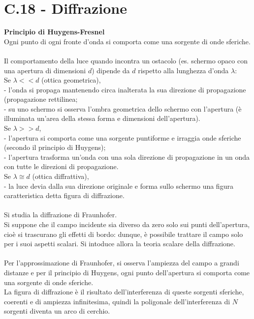 \documentclass{article}
\begin{document}
\section*{C.18 - Diffrazione}
\textbf{Principio di Huygens-Fresnel}\\
Ogni punto di ogni fronte d’onda si comporta come una sorgente di onde sferiche. \\
\\
Il comportamento della luce quando incontra un ostacolo (es. schermo opaco con una apertura di dimensioni $d$) dipende da $d$ rispetto alla lunghezza d’onda $\lambda$:\\
Se $\lambda << d$ (ottica geometrica),\\
- l’onda si propaga mantenendo circa inalterata la sua direzione di propagazione (propagazione rettilinea;\\
- su uno schermo si osserva l’ombra geometrica dello schermo con l’apertura (è illuminata un’area della stessa forma e dimensioni dell’apertura).\\
Se $\lambda >> d$,\\
- l’apertura si comporta come una sorgente puntiforme e irraggia onde sferiche (secondo il principio di Huygens);\\
- l’apertura trasforma un’onda con una sola direzione di propagazione in un onda con tutte le direzioni di propagazione.\\
Se $\lambda\cong d$ (ottica diffrattiva),\\
- la luce devia dalla sua direzione originale e forma sullo schermo una figura caratteristica detta figura di diffrazione.\\
\\
Si studia la diffrazione di Fraunhofer.\\
Si suppone che il campo incidente sia diverso da zero solo sui punti dell’apertura, cioè si trascurano gli effetti di bordo: dunque, è possibile trattare il campo solo per i suoi aspetti scalari. Si intoduce allora la teoria scalare della diffrazione.\\
\\
Per l'approssimazione di Fraunhofer, si osserva l'ampiezza del campo a grandi distanze e per il principio di Huygens, ogni punto dell’apertura si comporta come una sorgente di onde sferiche.\\
La figura di diffrazione è il risultato dell’interferenza di queste sorgenti sferiche, coerenti e di ampiezza infinitesima, quindi la poligonale dell’interferenza di $N$ sorgenti diventa un arco di cerchio.\\
\end{document}
